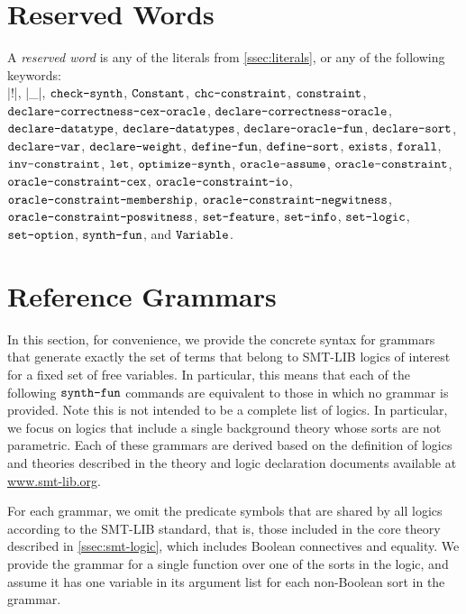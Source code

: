 \documentclass[english,a4paper,10pt]{article}
\begin{document}
\newpage
\begin{appendix}

\section{Reserved Words}%
\label{apx:reserved}

A \emph{reserved word} is any of the 
literals from \cref{ssec:literals},
or any of the following keywords:\\
\code|!|,
\code|_|,
$\texttt{check-synth}$,
$\texttt{Constant}$,
$\texttt{chc-constraint}$,
$\texttt{constraint}$,
$\texttt{declare-correctness-cex-oracle}$,
$\texttt{declare-correctness-oracle}$,
$\texttt{declare-datatype}$,
$\texttt{declare-datatypes}$,
$\texttt{declare-oracle-fun}$,
$\texttt{declare-sort}$,
$\texttt{declare-var}$,
$\texttt{declare-weight}$,
$\texttt{define-fun}$,
$\texttt{define-sort}$,
$\texttt{exists}$,
$\texttt{forall}$,
$\texttt{inv-constraint}$,
$\texttt{let}$,
$\texttt{optimize-synth}$,
$\texttt{oracle-assume}$,
$\texttt{oracle-constraint}$,
$\texttt{oracle-constraint-cex}$,
$\texttt{oracle-constraint-io}$,
$\texttt{oracle-constraint-membership}$,
$\texttt{oracle-constraint-negwitness}$,
$\texttt{oracle-constraint-poswitness}$,
$\texttt{set-feature}$,
$\texttt{set-info}$,
$\texttt{set-logic}$,
$\texttt{set-option}$,
$\texttt{synth-fun}$, and
$\texttt{Variable}$.


\section{Reference Grammars}%
\label{apx:ref-grammars}

In this section, for convenience, we provide the concrete syntax for
grammars that generate exactly the set of terms 
that belong to SMT-LIB logics of interest for a fixed set of free variables.
In particular, this means that each of the following $\texttt{synth-fun}$
commands are equivalent to those in which no grammar is provided.
Note this is not intended to be a complete list of logics.
In particular, we focus on logics that include a single background theory
whose sorts are not parametric.
Each of these grammars are derived
based on the definition of logics and theories
described in the theory and logic declaration documents
available at \url{www.smt-lib.org}.

For each grammar, we omit 
the predicate symbols that are shared by all logics
according to the SMT-LIB standard, that is,
those included in the core theory described in \cref{ssec:smt-logic},
which includes Boolean connectives and equality.
We provide the grammar
for a single function over one of the sorts in the logic,
and assume it has one variable in its argument list
for each non-Boolean sort in the grammar.


\end{appendix}
\end{document}
